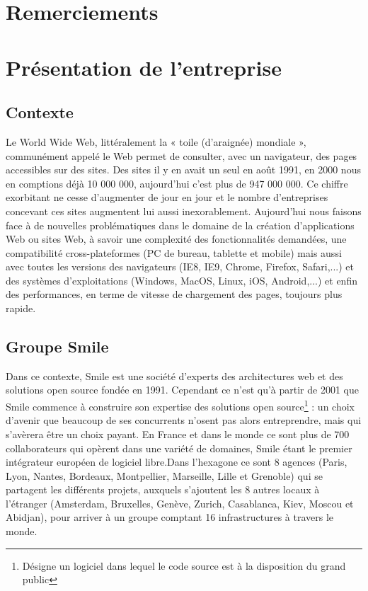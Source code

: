 \documentclass[a4paper,11pt,twoside]{report}
\begin{document}
\chapter*{Remerciements}
\thispagestyle{\chead{}}

\tableofcontents
\thispagestyle{\chead{}}

\chapter{Présentation de l'entreprise}
  \section{Contexte}
  Le World Wide Web, littéralement la « toile (d’araignée) mondiale », communément appelé le Web permet de consulter, avec un navigateur, des pages accessibles sur des sites. Des sites il y en avait un seul en août 1991, en 2000 nous en comptions déjà 10 000 000, aujourd'hui c'est plus de 947 000 000. Ce chiffre exorbitant ne cesse d'augmenter de jour en jour et le nombre d'entreprises concevant ces sites augmentent lui aussi inexorablement. Aujourd'hui nous faisons face à de nouvelles problématiques dans le domaine de la création d'applications Web ou sites Web, à savoir une complexité des fonctionnalités demandées, une compatibilité cross-plateformes (PC de bureau, tablette et mobile) mais aussi avec toutes les versions des navigateurs (IE8, IE9, Chrome, Firefox, Safari,...) et des systèmes d'exploitations (Windows, MacOS, Linux, iOS, Android,...) et enfin des performances, en terme de vitesse de chargement des pages, toujours plus rapide.
  
  \section{Groupe Smile}
  Dans ce contexte, Smile est une société d'experts des architectures web et des solutions open source fondée en 1991. Cependant ce n'est qu'à partir de 2001 que Smile commence à construire son expertise des solutions open source\footnote{Désigne un logiciel dans lequel le code source est à la disposition du grand public} : un choix d’avenir que beaucoup de ses concurrents n’osent pas alors entreprendre, mais qui s'avèrera être un choix payant. En France et dans le monde ce sont plus de 700 collaborateurs qui opèrent dans une variété de domaines, Smile étant le premier intégrateur européen de logiciel libre.Dans l'hexagone ce sont 8 agences (Paris, Lyon, Nantes, Bordeaux, Montpellier, Marseille, Lille et Grenoble) qui se partagent les différents projets, auxquels s'ajoutent les 8 autres locaux à l'étranger (Amsterdam, Bruxelles, Genève, Zurich, Casablanca, Kiev, Moscou et Abidjan), pour arriver à un groupe comptant 16 infrastructures à travers le monde.\newline
\end{document}
